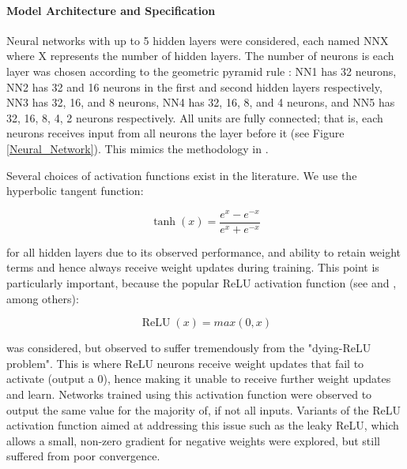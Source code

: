 \documentclass[11pt, a4paper, table]{article}
\begin{document}
\paragraph{Model Architecture and Specification}

Neural networks with up to 5 hidden layers were considered, each named NNX where X represents the number of hidden layers. The number of neurons is each layer was chosen according to the geometric pyramid rule \citep{masters_practical_1993}: NN1 has 32 neurons, NN2 has 32 and 16 neurons in the first and second hidden layers respectively, NN3 has 32, 16, and 8 neurons, NN4 has 32, 16, 8, and 4 neurons, and NN5 has 32, 16, 8, 4, 2 neurons respectively. All units are fully connected; that is, each neurons receives input from all neurons the layer before it (see Figure \ref{Neural_Network}). This mimics the methodology in \cite{gu_empirical_2018}.

Several choices of activation functions exist in the literature. We use the hyperbolic tangent function:

\begin{equation}
\operatorname{tanh}(x) = \frac{e^x - e^{-x}}{e^x + e^{-x}}
\end{equation}

for all hidden layers due to its observed performance, and ability to retain weight terms and hence always receive weight updates during training. This point is particularly important, because the popular ReLU activation function (see \cite{lecun_deep_2015} and \cite{ramachandran_searching_2017}, among others):

\begin{equation}
\operatorname{ReLU}(x) = max(0, x)
\end{equation}

was considered, but observed to suffer tremendously from the "dying-ReLU problem". This is where ReLU neurons receive weight updates that fail to activate (output a 0), hence making it unable to receive further weight updates and learn. Networks trained using this activation function were observed to output the same value for the majority of, if not all inputs. Variants of the ReLU activation function aimed at addressing this issue such as the leaky ReLU, which allows a small, non-zero gradient for negative weights were explored, but still suffered from poor convergence.
\end{document}
